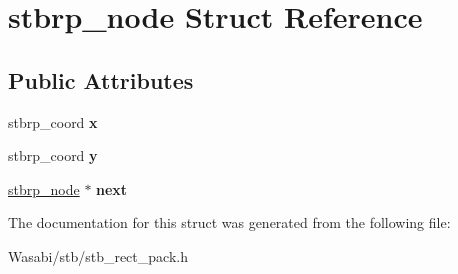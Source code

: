 \hypertarget{structstbrp__node}{}\section{stbrp\+\_\+node Struct Reference}
\label{structstbrp__node}
\subsection*{Public Attributes}
\begin{DoxyCompactItemize}
\item 
stbrp\+\_\+coord {\bfseries x}\hypertarget{structstbrp__node_a45ab31a88025db27d08040d715b129ea}{}\label{structstbrp__node_a45ab31a88025db27d08040d715b129ea}

\item 
stbrp\+\_\+coord {\bfseries y}\hypertarget{structstbrp__node_ad0415cb102a4f37aa45073653307e67e}{}\label{structstbrp__node_ad0415cb102a4f37aa45073653307e67e}

\item 
\hyperlink{structstbrp__node}{stbrp\+\_\+node} $\ast$ {\bfseries next}\hypertarget{structstbrp__node_a933cb2dd6cddc4fcaf10e3b40634bed4}{}\label{structstbrp__node_a933cb2dd6cddc4fcaf10e3b40634bed4}

\end{DoxyCompactItemize}


The documentation for this struct was generated from the following file\+:\begin{DoxyCompactItemize}
\item 
Wasabi/stb/stb\+\_\+rect\+\_\+pack.\+h\end{DoxyCompactItemize}
